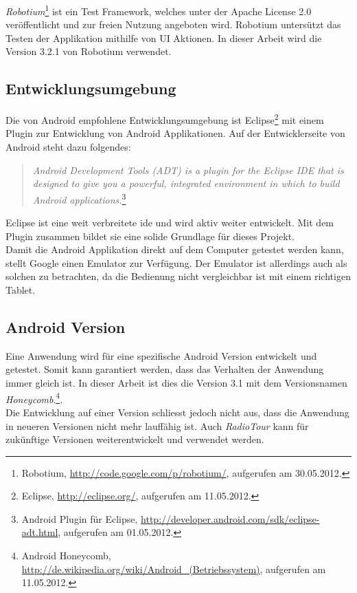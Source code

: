 \textit{Robotium}\footnote{Robotium, \url{http://code.google.com/p/robotium/}, aufgerufen am 30.05.2012.} ist ein Test Framework, welches unter der Apache License 2.0 veröffentlicht und zur freien Nutzung angeboten wird. Robotium untersützt das Testen der Applikation mithilfe von UI Aktionen. In dieser Arbeit wird die Version 3.2.1 von Robotium verwendet.


\subsection{Entwicklungsumgebung}
Die von Android empfohlene Entwicklungsumgebung ist Eclipse\footnote{Eclipse, \url{http://eclipse.org/}, aufgerufen am 11.05.2012.} mit einem Plugin zur Entwicklung von Android Applikationen. Auf der Entwicklerseite von Android steht dazu folgendes:
\begin{quote}
\textit{Android Development Tools (ADT) is a plugin for the Eclipse IDE that is designed to give you a powerful, integrated environment in which to build Android applications.}\footnote{Android Plugin für Eclipse, \url{http://developer.android.com/sdk/eclipse-adt.html}, aufgerufen am 01.05.2012.}
\end{quote}
Eclipse ist eine weit verbreitete \gls{ide} und wird aktiv weiter entwickelt. Mit dem Plugin zusammen bildet sie eine solide Grundlage für dieses Projekt.
\\

Damit die Android Applikation direkt auf dem Computer getestet werden kann, stellt Google einen Emulator zur Verfügung. Der Emulator ist allerdings auch als solchen zu betrachten, da die Bedienung nicht vergleichbar ist mit einem richtigen Tablet.

\subsection{Android Version}
Eine Anwendung wird für eine spezifische Android Version entwickelt und getestet. Somit kann garantiert werden, dass das Verhalten der Anwendung  immer gleich ist. In dieser Arbeit ist dies die Version 3.1 mit dem Versionsnamen \textit{Honeycomb}.\footnote{Android Honeycomb, \url{http://de.wikipedia.org/wiki/Android_(Betriebssystem)}, aufgerufen am 11.05.2012.}.
\\

Die Entwicklung auf einer Version schliesst jedoch nicht aus, dass die Anwendung in neueren Versionen nicht mehr lauffähig ist. Auch \textit{RadioTour} kann für zukünftige Versionen weiterentwickelt und verwendet werden.

